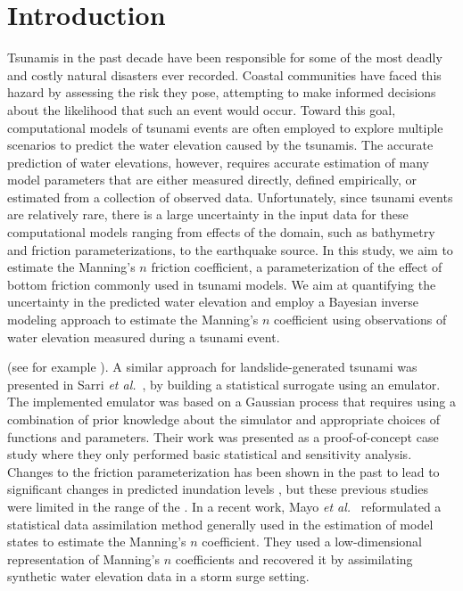 
\section{Introduction} \label{sec:intro}

Tsunamis in the past decade have been responsible for some of the most  deadly
and costly natural disasters ever recorded. Coastal communities have faced this
hazard by assessing the risk they pose, attempting  to make informed decisions
about the likelihood that such an event would  occur.
Toward this goal, computational models of  tsunami events are often
employed to explore multiple scenarios to predict the water elevation
caused by the tsunamis. The accurate prediction  of water elevations, however,
requires accurate estimation of many model parameters that are either measured
directly, defined empirically, or estimated from a collection of observed data.
Unfortunately, since tsunami events are relatively rare,  there is a large
uncertainty in the input data for these computational  models ranging from
effects of the domain, such as bathymetry and friction parameterizations,  to
the earthquake source.  In this study, we aim to estimate the Manning's $n$
friction coefficient, a parameterization of the effect of bottom friction 
commonly used in tsunami models.  We aim at quantifying the uncertainty in the 
predicted water elevation  and employ a Bayesian inverse modeling approach to 
estimate the Manning's $n$ coefficient using observations of water elevation 
measured during a tsunami event.

 (see
for example \cite{MacInnes:2013cr}).  A similar approach for landslide-generated
tsunami was presented in Sarri \emph{et al.}~\cite{Sarri2012}, by building a statistical surrogate
using an emulator. The implemented emulator was based on a Gaussian
process that requires using a combination of prior knowledge about the simulator
and appropriate choices of functions and parameters. Their work was presented as
a proof-of-concept case study where they only performed basic statistical and
sensitivity analysis.  Changes to the friction parameterization has been shown in 
the past to lead to significant changes in predicted inundation levels \cite{Myers:2001el, 
Jakeman:2010hk}, but these previous studies were limited in the range of the 
.  
In a recent work, Mayo \emph{et al.}~\cite{Mayo:2014} reformulated a statistical data assimilation method
generally used in the estimation of model states to estimate the Manning's $n$
coefficient. They used a low-dimensional representation of
Manning's $n$ coefficients and recovered it by assimilating synthetic water elevation data
in a storm surge setting.

